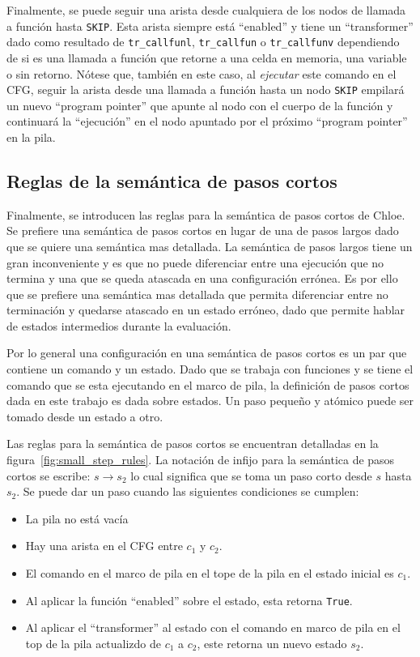 Finalmente, se puede seguir una arista desde cualquiera de los nodos de llamada a función hasta \verb|SKIP|.
Esta arista siempre está ``enabled'' y tiene un ``transformer'' dado como resultado de \verb|tr_callfunl|, \verb|tr_callfun| o \verb|tr_callfunv| dependiendo de si es una llamada a función que retorne a una celda en memoria, una variable o sin retorno.
Nótese que, también en este caso, al \textit{ejecutar} este comando en el CFG, seguir la arista desde una llamada a función hasta un nodo \verb|SKIP| empilará un nuevo ``program pointer'' que apunte al nodo con el cuerpo de la función y continuará la ``ejecución'' en el nodo apuntado por el próximo ``program pointer'' en la pila.

\subsection{Reglas de la semántica de pasos cortos}\label{subsection:rules_small_step}

Finalmente, se introducen las reglas para la semántica de pasos cortos de Chloe.
Se prefiere una semántica de pasos cortos en lugar de una de pasos largos dado que se quiere una semántica mas detallada.
La semántica de pasos largos tiene un gran inconveniente y es que no puede diferenciar entre una ejecución que no termina y una que se queda atascada en una configuración errónea.
Es por ello que se prefiere una semántica mas detallada que permita diferenciar entre no terminación y quedarse atascado en un estado erróneo, dado que permite hablar de estados intermedios durante la evaluación.

Por lo general una configuración en una semántica de pasos cortos es un par que contiene un comando y un estado.
Dado que se trabaja con funciones y se tiene el comando que se esta ejecutando en el marco de pila, la definición de pasos cortos dada en este trabajo es dada sobre estados.
Un paso pequeño y atómico puede ser tomado desde un estado a otro.

Las reglas para la semántica de pasos cortos se encuentran detalladas en la figura~\ref{fig:small_step_rules}.
La notación de infijo para la semántica de pasos cortos se escribe: $s \rightarrow s_{2}$ lo cual significa que se toma un paso corto desde $s$ hasta $s_{2}$.
Se puede dar un paso cuando las siguientes condiciones se cumplen:

\begin{itemize}
  \item{La pila no está vacía}
  \item{Hay una arista en el CFG entre $c_{1}$ y $c_{2}$.}
  \item{El comando en el marco de pila en el tope de la pila en el estado inicial es $c_{1}$.}
  \item{Al aplicar la función ``enabled'' sobre el estado, esta retorna \verb|True|.}
  \item{Al aplicar el ``transformer'' al estado con el comando en marco de pila en el top de la pila actualizdo de $c_{1}$ a $c_{2}$, este retorna un nuevo estado $s_{2}$.}
\end{itemize}

